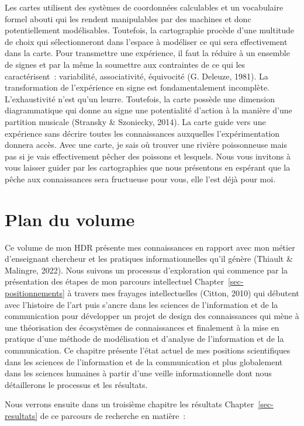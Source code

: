 \documentclass[
  a4paper,
  DIV=11,
  numbers=noendperiod]{scrreprt}
\begin{document}
Les cartes utilisent des systèmes de coordonnées calculables et un
vocabulaire formel abouti qui les rendent manipulables par des machines
et donc potentiellement modélisables. Toutefois, la cartographie procède
d'une multitude de choix qui sélectionneront dans l'espace à modéliser
ce qui sera effectivement dans la carte. Pour transmettre une
expérience, il faut la réduire à un ensemble de signes et par la même la
soumettre aux contraintes de ce qui les caractérisent~: variabilité,
associativité, équivocité (G. Deleuze, 1981). La transformation de
l'expérience en signe est fondamentalement incomplète. L'exhaustivité
n'est qu'un leurre. Toutefois, la carte possède une dimension
diagrammatique qui donne au signe une potentialité d'action à la manière
d'une partition musicale (Stransky \& Szoniecky, 2014). La carte guide
vers une expérience sans décrire toutes les connaissances auxquelles
l'expérimentation donnera accès. Avec une carte, je sais où trouver une
rivière poissonneuse mais pas si je vais effectivement pêcher des
poissons et lesquels. Nous vous invitons à vous laisser guider par les
cartographies que nous présentons en espérant que la pêche aux
connaissances sera fructueuse pour vous, elle l'est déjà pour moi.

\section{Plan du volume}\label{sec-planVolume}

Ce volume de mon HDR présente mes connaissances en rapport avec mon
métier d'enseignant chercheur et les pratiques informationnelles qu'il
génère (Thiault \& Malingre, 2022). Nous suivons un processus
d'exploration qui commence par la présentation des étapes de mon
parcours intellectuel Chapter~\ref{sec-positionnements} à travers mes
frayages intellectuelles (Citton, 2010) qui débutent avec l'histoire de
l'art puis s'ancre dans les sciences de l'information et de la
communication pour développer un projet de design des connaissances qui
mène à une théorisation des écosystèmes de connaissances et finalement à
la mise en pratique d'une méthode de modélisation et d'analyse de
l'information et de la communication. Ce chapitre présente l'état actuel
de mes positions scientifiques dans les sciences de l'information et de
la communication et plus globalement dans les sciences humaines à partir
d'une veille informationnelle dont nous détaillerons le processus et les
résultats.

Nous verrons ensuite dans un troisième chapitre les résultats
Chapter~\ref{sec-resultats} de ce parcours de recherche en matière~:
\end{document}
